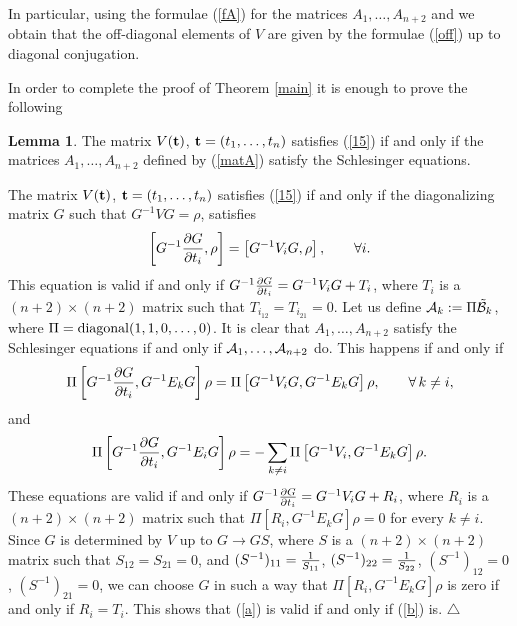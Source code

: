 \documentclass[12pt]{article}
\theoremstyle{definition}
\theoremstyle{theorem}
\newtheorem{lm}[df]{Lemma}
\begin{document}
In particular, using the formulae (\ref{fA}) for the matrices 
${A}_1,\dots,{A}_{n+2}$ and we obtain that the off-diagonal
elements of $V$ are given by the formulae (\ref{off}) up to diagonal 
conjugation.

In order to complete the proof of Theorem \ref{main} it is enough to prove the
following

\begin{lm}
The matrix $V({\bf t})$, ${\bf t}=(t_1,\dots,t_{n})$ satisfies (\ref{15})
if and only if the matrices $A_1,\dots,A_{n+2}$ defined by (\ref{matA})
satisfy the Schlesinger equations. \label{lmequiv1} \end{lm}

The matrix $V({\bf t})$, ${\bf t}=(t_1,\dots,t_{n})$ satisfies (\ref{15})
if and only if the diagonalizing matrix $G$ such that $G^{-1}VG=\rho$, 
satisfies
\begin{equation}
\left[ G^{-1}{\partial G\over\partial t_i},\rho\right]=
\left[G^{-1} V_i G, \rho\right],\qquad \forall i.
\label{a}\end{equation}
This equation is valid if and only if 
$ G^{-1}{\partial G\over\partial t_i} =G^{-1}V_iG +T_i$,
where $T_i$ is a $(n+2)\times(n+2)$ matrix such that $T_{i_{12}}=T_{i_{21}}=0$.
Let us define ${\cal A}_k:=\Pi\tilde{\cal B}_k$, where 
$\Pi={\rm diagonal}(1,1,0,\dots,0)$. It is clear that $A_1,\dots,A_{n+2}$ 
satisfy the Schlesinger equations if and only if ${\cal A}_1,\dots,
{\cal A}_{n+2}$ do. This happens if and only if
$$
\Pi\left[G^{-1}{\partial G\over\partial t_i} ,G^{-1}E_kG\right]\rho=
 \Pi\left[G^{-1} V_i G,G^{-1} E_kG\right]\rho,\qquad \forall\,k\neq i,
$$
and
\begin{equation}
\Pi\left[G^{-1}{\partial G\over\partial t_i} ,G^{-1}E_iG\right]\rho=
-\sum_{k\neq i} \Pi\left[G^{-1} V_i,G^{-1} E_kG\right]\rho.
\label{b}\end{equation}
These equations are valid if and only if $ G^{-1}{\partial G\over\partial t_i} 
=G^{-1}V_iG +R_i$, where $R_i$ is a $(n+2)\times(n+2)$ matrix such that 
$\Pi[R_i,G^{-1} E_kG]\rho=0$ for every $k\neq i$. Since $G$ is determined by
$V$ up to  $G\to G S$, where $S$ is a $(n+2)\times(n+2)$ matrix such that
$S_{12}=S_{21}=0$, and $(S^{-1})_{11}={1\over S_{11}}$, $(S^{-1})_{22}=
{1\over S_{22}}$, $(S^{-1})_{12}=0$, $(S^{-1})_{21}=0$, we can choose 
$G$ in such a way that 
$\Pi[R_i,G^{-1} E_kG]\rho$ is zero if and only if $R_i=T_i$. This shows that 
(\ref{a}) is valid if and only if (\ref{b}) is.
{\hfill $\bigtriangleup$}
\end{document}

